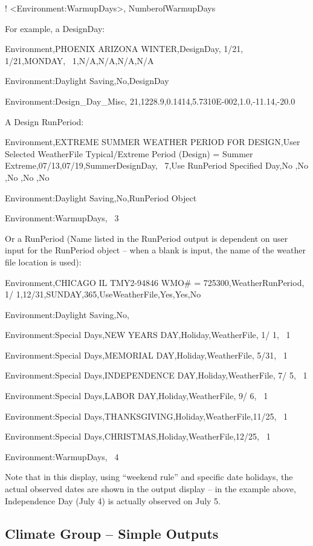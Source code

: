 ! \textless{}Environment:WarmupDays\textgreater{}, NumberofWarmupDays

For example, a DesignDay:

Environment,PHOENIX ARIZONA WINTER,DesignDay, 1/21, 1/21,MONDAY,~ 1,N/A,N/A,N/A,N/A

Environment:Daylight Saving,No,DesignDay

Environment:Design\_Day\_Misc, 21,1228.9,0.1414,5.7310E-002,1.0,-11.14,-20.0

A Design RunPeriod:

Environment,EXTREME SUMMER WEATHER PERIOD FOR DESIGN,User Selected WeatherFile Typical/Extreme Period (Design) = Summer Extreme,07/13,07/19,SummerDesignDay,~ 7,Use RunPeriod Specified Day,No ,No ,No ,No ,No

Environment:Daylight Saving,No,RunPeriod Object

Environment:WarmupDays,~ 3

Or a RunPeriod (Name listed in the RunPeriod output is dependent on user input for the RunPeriod object -- when a blank is input, the name of the weather file location is used):

Environment,CHICAGO IL TMY2-94846 WMO\# = 725300,WeatherRunPeriod, 1/ 1,12/31,SUNDAY,365,UseWeatherFile,Yes,Yes,No

Environment:Daylight Saving,No,

Environment:Special Days,NEW YEARS DAY,Holiday,WeatherFile, 1/ 1,~ 1

Environment:Special Days,MEMORIAL DAY,Holiday,WeatherFile, 5/31,~ 1

Environment:Special Days,INDEPENDENCE DAY,Holiday,WeatherFile, 7/ 5,~ 1

Environment:Special Days,LABOR DAY,Holiday,WeatherFile, 9/ 6,~ 1

Environment:Special Days,THANKSGIVING,Holiday,WeatherFile,11/25,~ 1

Environment:Special Days,CHRISTMAS,Holiday,WeatherFile,12/25,~ 1

Environment:WarmupDays,~ 4

Note that in this display, using ``weekend rule'' and specific date holidays, the actual observed dates are shown in the output display -- in the example above, Independence Day (July 4) is actually observed on July 5.

\subsection{Climate Group -- Simple Outputs}\label{climate-group-simple-outputs}

